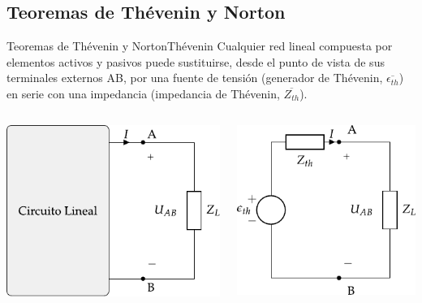 \documentclass[aspectratio=169, xcolor={usenames,svgnames,dvipsnames}]{beamer}
\begin{document}
\subsection{Teoremas de Thévenin y Norton}
\begin{frame}{Teoremas de Thévenin y Norton}{Thévenin}
    Cualquier \alert{red lineal} compuesta por elementos activos y pasivos puede sustituirse, desde el punto de vista de sus terminales externos AB, por una \alert{fuente de tensión} (generador de Thévenin, \(\overline{\epsilon_{th}}\)) en \alert{serie} con una impedancia (impedancia de Thévenin, \(\overline{Z_{th}}\)).

    \begin{columns}
      \begin{column}{0.5\linewidth}
        \begin{center}
          \includegraphics{../figs/EquivalenteThevenin.pdf}
        \end{center}
      \end{column}
      \begin{column}{0.5\linewidth}
        \begin{center}
          \includegraphics{../figs/EquivalenteThevenin2.pdf}
        \end{center}
      \end{column}
    \end{columns}
    
\end{frame}
\end{document}

